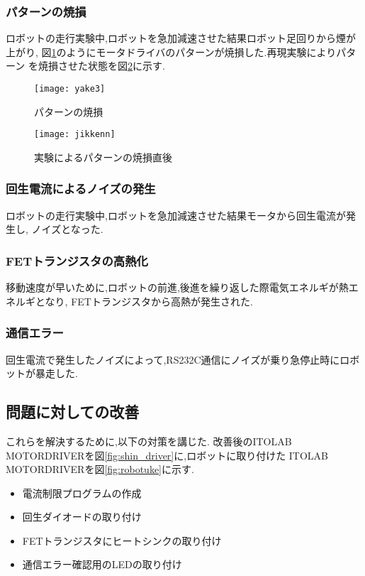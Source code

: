 \subsubsection{パターンの焼損}
ロボットの走行実験中,ロボットを急加減速させた結果ロボット足回りから煙が上がり,
図\ref{fig:yake3}のようにモータドライバのパターンが焼損した.再現実験によりパターン
を焼損させた状態を図\ref{fig:jikkenn}に示す.
\begin{figure}[H]
  \begin{center}
    \texttt{[image: yake3]}
    \end{center}
  \caption{パターンの焼損}
 \label{fig:yake3}
\end{figure}
\begin{figure}[H]
  \begin{center}
    \texttt{[image: jikkenn]}
    \end{center}
  \caption{実験によるパターンの焼損直後}
 \label{fig:jikkenn}
\end{figure}
\subsubsection{回生電流によるノイズの発生}
ロボットの走行実験中,ロボットを急加減速させた結果モータから回生電流が発生し,
ノイズとなった.
\subsubsection{FETトランジスタの高熱化}
移動速度が早いために,ロボットの前進,後進を繰り返した際電気エネルギが熱エネルギとなり,
FETトランジスタから高熱が発生された.
\subsubsection{通信エラー}
回生電流で発生したノイズによって,RS232C通信にノイズが乗り急停止時にロボットが暴走した.

\subsection{問題に対しての改善}
これらを解決するために,以下の対策を講じた.
改善後のITOLAB MOTORDRIVERを図\ref{fig:shin_driver}に,ロボットに取り付けた
ITOLAB MOTORDRIVERを図\ref{fig:robotuke}に示す.
\begin{itemize}
\item 電流制限プログラムの作成
\item 回生ダイオードの取り付け
\item FETトランジスタにヒートシンクの取り付け
\item 通信エラー確認用のLEDの取り付け
\end{itemize}
